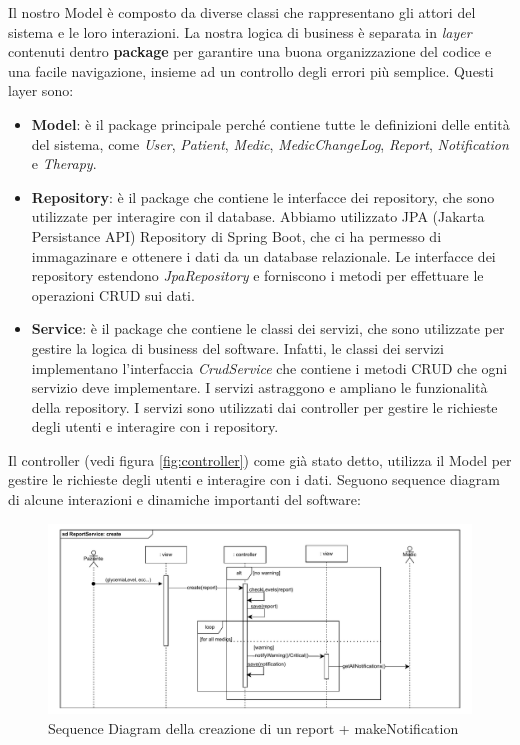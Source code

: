 \documentclass[a4paper]{article}
\begin{document}
Il nostro Model è composto da diverse classi che rappresentano gli attori del sistema e le loro interazioni.
La nostra logica di business è separata in \textit{layer}  contenuti dentro \textbf{package} 
per garantire una buona organizzazione del codice e una facile navigazione, insieme
ad un controllo degli errori più semplice.
Questi layer sono:
\begin{itemize}
  \item \textbf{Model}: è il package principale perché contiene tutte le definizioni delle entità del sistema, come \textit{User}, \textit{Patient}, \textit{Medic}, \textit{MedicChangeLog}, \textit{Report}, \textit{Notification} e \textit{Therapy}.
  \item \textbf{Repository}: è il package che contiene le interfacce dei repository, che sono utilizzate per interagire con il database. 
  Abbiamo utilizzato JPA (Jakarta Persistance API) Repository di Spring Boot, che ci ha permesso di immagazinare e ottenere i dati da un 
  database relazionale. 
  Le interfacce dei repository estendono \textit{JpaRepository} e forniscono i metodi per effettuare le operazioni CRUD sui dati.
  \item \textbf{Service}: è il package che contiene le classi dei servizi, che sono utilizzate per gestire la logica di business del software. 
  Infatti, le classi dei servizi implementano l'interfaccia \textit{CrudService} che contiene i metodi CRUD che ogni servizio deve implementare.
  I servizi astraggono e ampliano le funzionalità della repository.
  I servizi sono utilizzati dai controller per gestire le richieste degli utenti e interagire con i repository.
\end{itemize}
Il controller (vedi figura \ref{fig:controller}) come già stato detto, utilizza il Model per 
gestire le richieste degli utenti e interagire con i dati. 
Seguono sequence diagram di alcune interazioni e dinamiche importanti del software:
\begin{figure}[H]
  \begin{center}
    \includegraphics[width=1\textwidth]{sdReportCreate.pdf}
  \end{center}
  \caption{Sequence Diagram della creazione di un report + makeNotification} 
\end{figure}
\noindent
\end{document}
